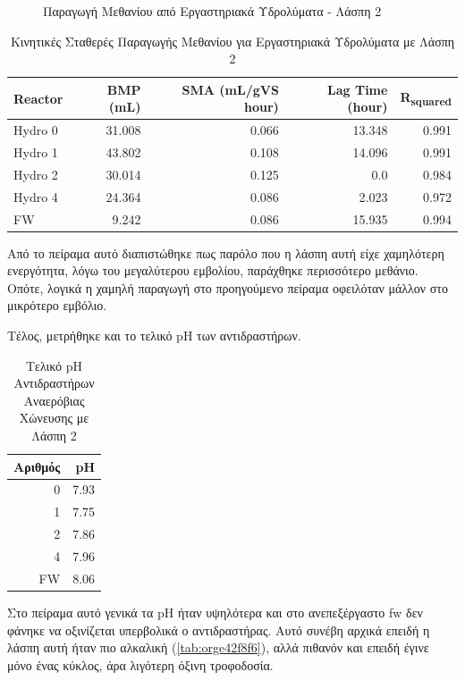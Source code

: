 \documentclass[11pt]{report}
\begin{document}
\begin{enumerate}
\begin{figure}[htbp]
\centering

\caption{\label{fig:orge07d5bf}Παραγωγή Μεθανίου από Εργαστηριακά Υδρολύματα - Λάσπη 2}
\end{figure}

\begin{table}[htbp]
\caption{\label{tab:org177dd94}Κινητικές Σταθερές Παραγωγής Μεθανίου για Εργαστηριακά Υδρολύματα με Λάσπη 2}
\centering
\begin{tabular}{lrrrr}
Reactor & BMP (mL) & SMA (mL/gVS hour) & Lag Time (hour) & R\textsubscript{squared}\\[0pt]
\hline
Hydro 0 & 31.008 & 0.066 & 13.348 & 0.991\\[0pt]
Hydro 1 & 43.802 & 0.108 & 14.096 & 0.991\\[0pt]
Hydro 2 & 30.014 & 0.125 & 0.0 & 0.984\\[0pt]
Hydro 4 & 24.364 & 0.086 & 2.023 & 0.972\\[0pt]
FW & 9.242 & 0.086 & 15.935 & 0.994\\[0pt]
\end{tabular}
\end{table}

Από το πείραμα αυτό διαπιστώθηκε πως παρόλο που η λάσπη αυτή είχε χαμηλότερη ενεργότητα, λόγω του μεγαλύτερου εμβολίου, παράχθηκε περισσότερο μεθάνιο. Οπότε, λογικά η χαμηλή παραγωγή στο προηγούμενο πείραμα οφειλόταν μάλλον στο μικρότερο εμβόλιο.

Τέλος, μετρήθηκε και το τελικό pH των αντιδραστήρων.

\begin{table}[htbp]
\caption{\label{tab:orgf26800c}Τελικό pH Αντιδραστήρων Αναερόβιας Χώνευσης με Λάσπη 2}
\centering
\begin{tabular}{rr}
Αριθμός & pH\\[0pt]
\hline
0 & 7.93\\[0pt]
1 & 7.75\\[0pt]
2 & 7.86\\[0pt]
4 & 7.96\\[0pt]
FW & 8.06\\[0pt]
\end{tabular}
\end{table}

Στο πείραμα αυτό γενικά τα pH ήταν υψηλότερα και στο ανεπεξέργαστο \acrshort{fw} δεν φάνηκε να οξινίζεται υπερβολικά ο αντιδραστήρας. Αυτό συνέβη αρχικά επειδή η λάσπη αυτή ήταν πιο αλκαλική (\ref{tab:orge42f8f6}), αλλά πιθανόν και επειδή έγινε μόνο ένας κύκλος, άρα λιγότερη όξινη τροφοδοσία.


\end{enumerate}
\end{document}
